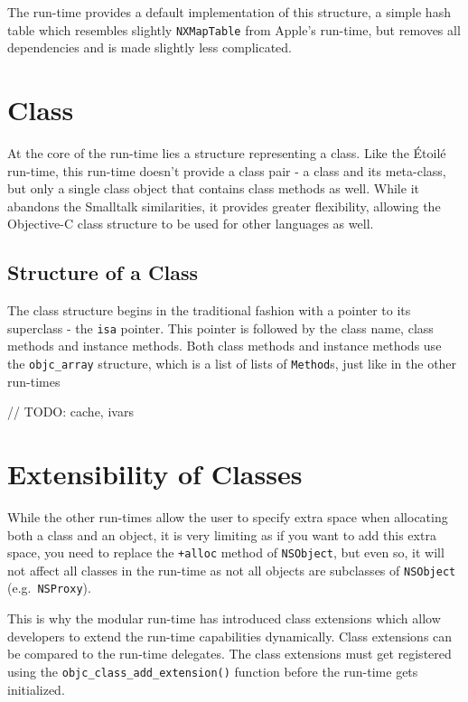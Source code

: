 The run-time provides a default implementation of this structure, a simple hash table which resembles slightly \verb=NXMapTable= from Apple's run-time, but removes all dependencies and is made slightly less complicated.

\section{Class}

At the core of the run-time lies a structure representing a class. Like the \'Etoil\'e run-time, this run-time doesn't provide a class pair - a class and its meta-class, but only a single class object that contains class methods as well. While it abandons the Smalltalk similarities, it provides greater flexibility, allowing the Objective-C class structure to be used for other languages as well.

\subsection{Structure of a Class}

The class structure begins in the traditional fashion with a pointer to its superclass - the \verb=isa= pointer. This pointer is followed by the class name, class methods and instance methods. Both class methods and instance methods use the \verb=objc_array= structure, which is a list of lists of \verb=Method=s, just like in the other run-times 

// TODO: cache, ivars

\section{Extensibility of Classes}

While the other run-times allow the user to specify extra space when allocating both a class and an object, it is very limiting as if you want to add this extra space, you need to replace the \verb=+alloc= method of \verb=NSObject=, but even so, it will not affect all classes in the run-time as not all objects are subclasses of \verb=NSObject= (e.g.\ \verb=NSProxy=).

This is why the modular run-time has introduced class extensions which allow developers to extend the run-time capabilities dynamically. Class extensions can be compared to the run-time delegates. The class extensions must get registered using the \verb=objc_class_add_extension()= function before the run-time gets initialized.

